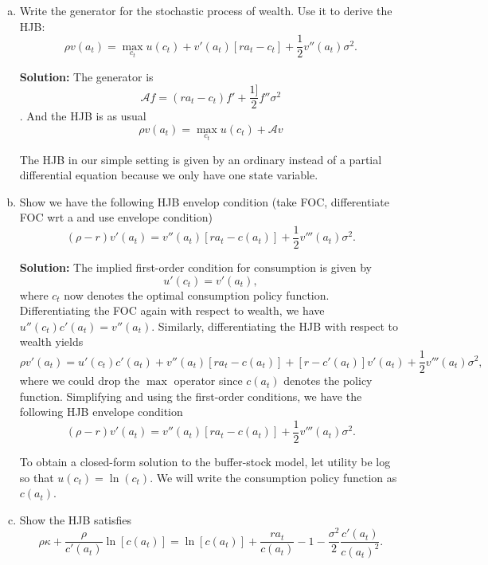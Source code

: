 \documentclass[11pt]{extarticle}
\theoremstyle{plain}
\theoremstyle{definition}
\begin{document}
\begin{enumerate}[(a)]

\item Write the generator for the stochastic process of wealth. Use it to derive the HJB:
\begin{equation}
	\rho v(a_t) = \max_{c_t} u(c_t) + v'(a_t) [ra_t - c_t] + \frac{1}{2} v''(a_t) \sigma^2.
\end{equation}

\textbf{Solution:} The generator is $$\mathcal A f = (ra_t-c_t)f'+\frac{1]}{2} f''\sigma^2$$. And the HJB is as usual
$$\rho v(a_t) = \max_{c_t} u(c_t) + \mathcal A v$$


The HJB in our simple setting is given by an ordinary instead of a partial differential equation because we only have one state variable. 
\item Show we have the following HJB envelop condition (take FOC, differentiate FOC wrt a and use envelope condition)
\begin{equation*}
	(\rho - r) v'(a_t) = v''(a_t) [ra_t - c(a_t)] + \frac{1}{2} v'''(a_t) \sigma^2.
\end{equation*}


\textbf{Solution:}
The implied first-order condition for consumption is given by
\begin{equation}
	u'(c_t) = v'(a_t),
\end{equation}
where $c_t$ now denotes the optimal consumption policy function. Differentiating the FOC again with respect to wealth, we have $u''(c_t) c'(a_t) = v''(a_t)$. Similarly, differentiating the HJB with respect to wealth yields 
\begin{equation*}
	\rho v'(a_t) = u'(c_t)c'(a_t) + v''(a_t) [ra_t - c(a_t)] + [r - c'(a_t)] v'(a_t) + \frac{1}{2} v'''(a_t) \sigma^2,
\end{equation*}
where we could drop the $\max$ operator since $c(a_t)$ denotes the policy function. Simplifying and using the first-order conditions, we have the following HJB envelope condition
\begin{equation*}
	(\rho - r) v'(a_t) = v''(a_t) [ra_t - c(a_t)] + \frac{1}{2} v'''(a_t) \sigma^2.
\end{equation*}


To obtain a closed-form solution to the buffer-stock model, let utility be log so that $u(c_t) = \ln(c_t)$. We will write the consumption policy function as $c(a_t)$. 
\item Show the HJB satisfies
\begin{equation*}
	\rho \kappa + \frac{\rho}{c'(a_t)} \ln[c(a_t)] = \ln[c(a_t)] + \frac{r a_t}{c(a_t)} - 1 - \frac{\sigma^2}{2} \frac{c'(a_t)}{c(a_t)^2}.
\end{equation*}


\end{enumerate}
\end{document}
